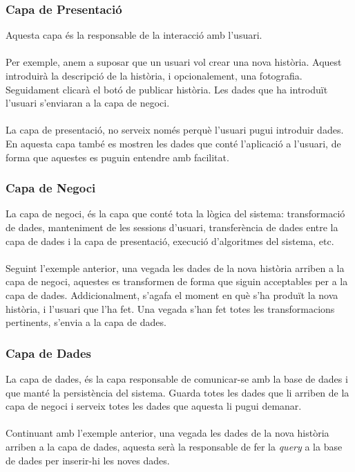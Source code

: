 \documentclass[11pt,catalan,listoffigures,listoftables]{tfgetsinf}
\begin{document}
\subsubsection{Capa de Presentació}

Aquesta capa és la responsable de la interacció amb l'usuari. \\ \\
Per exemple, anem a suposar que un usuari vol crear una nova història. Aquest introduirà la descripció de la història, i opcionalement, una fotografia. Seguidament clicarà el botó de publicar història. Les dades que ha introduït l'usuari s'enviaran a la capa de negoci.\\ \\
La capa de presentació, no serveix només perquè l'usuari pugui introduir dades. En aquesta capa també es mostren les dades que conté l'aplicació a l'usuari, de forma que aquestes es puguin entendre amb facilitat.

\subsubsection{Capa de Negoci}

La capa de negoci, és la capa que conté tota la lògica del sistema: transformació de dades, manteniment de les sessions d'usuari, transferència de dades entre la capa de dades i la capa de presentació, execució d'algoritmes del sistema, etc. \\ \\
Seguint l'exemple anterior, una vegada les dades de la nova història arriben a la capa de negoci, aquestes es transformen de forma que siguin acceptables per a la capa de dades. Addicionalment, s'agafa el moment en què s'ha produït la nova història, i l'usuari que l'ha fet. Una vegada s'han fet totes les transformacions pertinents, s'envia a la capa de dades.

\subsubsection{Capa de Dades}

La capa de dades, és la capa responsable de comunicar-se amb la base de dades i que manté la persistència del sistema. Guarda totes les dades que li arriben de la capa de negoci i serveix totes les dades que aquesta li pugui demanar.\\ \\
Continuant amb l'exemple anterior, una vegada les dades de la nova història arriben a la capa de dades, aquesta serà la responsable de fer la \textit{query} a la base de dades per inserir-hi les noves dades.
\end{document}

